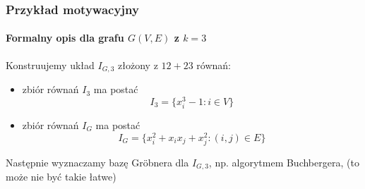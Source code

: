 \documentclass{beamer}
\begin{document}
\begin{frame}
    \frametitle{Przykład motywacyjny}
    \framesubtitle{Formalny opis dla grafu $G(V,E)$ z $k=3$}

    Konstruujemy układ $I_{G,3}$ złożony z $12 + 23$ równań:
    \begin{itemize}
        \item zbiór równań $I_3$ ma postać
            \begin{equation*}
                I_3 = \{ x_i^3 - 1 : i \in V \}
            \end{equation*}
            \pause
        \item zbiór równań $I_G$ ma postać
            \begin{equation*}
                I_G = \{ x_i^2 + x_i x_j + x_j^2 : (i,j) \in E \}
            \end{equation*}
    \end{itemize}
    \pause
    Następnie wyznaczamy bazę Gr\"{o}bnera dla $I_{G,3}$, np. algorytmem
    Buchbergera, \structure{$\ldots$} (to może nie być takie łatwe)
\end{frame}
\end{document}

